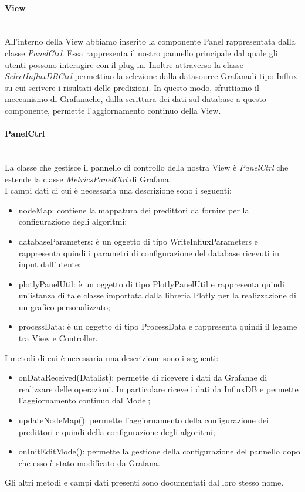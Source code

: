 \paragraph{View} \mbox{}\\ [1mm]
All'interno della View abbiamo inserito la componente Panel rappresentata dalla classe \textit{PanelCtrl}. Essa rappresenta il nostro pannello principale dal quale gli utenti possono interagire con il plug-in.
Inoltre attraverso la classe \textit{SelectInfluxDBCtrl} permettiao la selezione dalla datasource Grafana\glosp di tipo Influx su cui scrivere i risultati delle predizioni. In questo modo, sfruttiamo il meccanismo di Grafana\glosp che, dalla scrittura dei dati sul database a questo componente, permette l'aggiornamento continuo della View.
\paragraph*{PanelCtrl} \mbox{}\\ [1mm]
La classe che gestisce il pannello di controllo della nostra View è \textit{PanelCtrl} che estende la classe \textit{MetricsPanelCtrl} di Grafana\glo. \\
I campi dati di cui è necessaria una descrizione sono i seguenti:
\begin{itemize}
	\item nodeMap: contiene la mappatura dei predittori da fornire per la configurazione degli algoritmi;
	\item databaseParameters: è un oggetto di tipo WriteInfluxParameters e rappresenta quindi i parametri di configurazione del database ricevuti in input dall'utente;
	\item plotlyPanelUtil: è un oggetto di tipo PlotlyPanelUtil e rappresenta quindi un'istanza di tale classe importata dalla libreria Plotly per la realizzazione di un grafico personalizzato;
	\item processData: è un oggetto di tipo ProcessData e rappresenta quindi il legame tra View e Controller.
\end{itemize}
I metodi di cui è necessaria una descrizione sono i seguenti:
\begin{itemize}
	\item onDataReceived(Datalist): permette di ricevere i dati da Grafana\glosp e di realizzare delle operazioni. In particolare riceve i dati da InfluxDB e permette l'aggiornamento continuo dal Model;
	\item updateNodeMap(): permette l'aggiornamento della configurazione dei predittori e quindi della configurazione degli algoritmi;
	\item onInitEditMode(): permette la gestione della configurazione del pannello dopo che esso è stato modificato da Grafana\glo.
\end{itemize}
Gli altri metodi e campi dati presenti sono documentati dal loro stesso nome.
